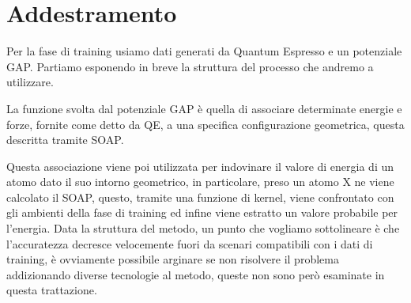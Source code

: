 

\section{Addestramento}

Per la fase di training usiamo dati generati da Quantum Espresso e un potenziale GAP. Partiamo esponendo in breve la struttura del processo che andremo a utilizzare.

La funzione svolta dal potenziale GAP è quella di associare determinate energie e forze, fornite come detto da QE, a una specifica configurazione geometrica, questa descritta tramite SOAP. 

Questa associazione viene poi utilizzata per indovinare il valore di energia di un atomo dato il suo intorno geometrico, in particolare, preso un atomo X ne viene calcolato il SOAP, questo, tramite una funzione di kernel, viene confrontato con gli ambienti della fase di training ed infine viene estratto un valore probabile per l'energia.
Data la struttura del metodo, un punto che vogliamo sottolineare è che l'accuratezza decresce velocemente fuori da scenari compatibili con i dati di training, è ovviamente possibile arginare se non risolvere il problema addizionando diverse tecnologie al metodo, queste non sono però esaminate in questa trattazione.

